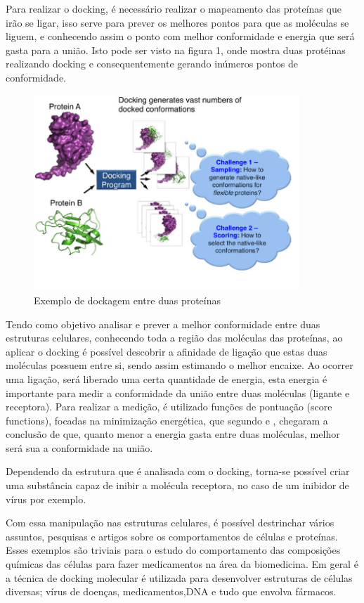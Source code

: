 \documentclass[tcc, capa]{texucpel}
\begin{document}
Para realizar o docking, é necessário realizar o mapeamento das proteínas que irão se ligar, isso serve para prever os melhores pontos para que as moléculas se liguem, e conhecendo assim o ponto com melhor conformidade e energia que será gasta para a união. Isto pode ser visto na figura 1, onde mostra duas protéinas realizando  docking e consequentemente gerando inúmeros pontos de conformidade.

      \begin{figure}[!htb]
	\centering
 \cite{xue2015protein}
    \caption{Exemplo de dockagem entre duas proteínas}
    \includegraphics[width=10cm]{imagens/mostra_docking.png}
	\end{figure}
    
Tendo como objetivo analisar e prever a melhor conformidade entre duas estruturas celulares, conhecendo toda a região das moléculas das proteínas, ao aplicar o docking é possível descobrir a afinidade de ligação que estas duas moléculas possuem entre si, sendo assim estimando o melhor encaixe.
Ao ocorrer uma ligação, será liberado uma certa quantidade de energia, esta energia é importante para medir a conformidade da união entre duas moléculas (ligante e receptora).
Para realizar a medição, é utilizado funções de pontuação (score functions), focadas na minimização energética, que  segundo \cite{kitchen2004docking} e \cite{lybrand1995ligand}, chegaram a conclusão de que, quanto menor a energia gasta entre duas moléculas, melhor será sua a conformidade na união. 

Dependendo da estrutura que é analisada com o docking, torna-se possível criar uma substância capaz de inibir a molécula receptora, no caso de um inibidor de vírus por exemplo. \cite{ishikawa2011binding}

Com essa manipulação nas estruturas celulares, é possível destrinchar vários assuntos, pesquisas e artigos sobre os comportamentos de células e proteínas.
Esses exemplos são triviais para o estudo do comportamento das composições químicas das células para fazer medicamentos na área da biomedicina. 
Em geral é a técnica de docking molecular é utilizada para desenvolver estruturas de células diversas; vírus de doenças, medicamentos,DNA e tudo que envolva fármacos. 
\end{document}
